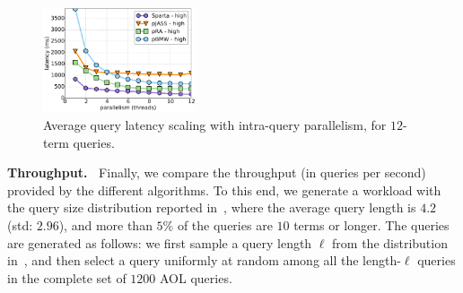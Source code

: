 {{\begin{figure}[tbh]
\centering
{}
         \includegraphics[width=0.4\textwidth]{figures/latency_12terms_clueweb.pdf}
\caption{Average query latency scaling with intra-query parallelism, for $12$-term queries.}
\label{fig:threads-scaling}
\end{figure}

{\bf Throughput.\ } Finally, we compare the throughput (in queries per second) provided by the different
algorithms. To this end, we generate a workload with the query size distribution reported in~\cite{sigir/Guy16},
where the average query length is $4.2$ (std: $2.96$), and more than $5\%$ of the queries are $10$ terms or longer.
The queries are generated as follows: we first sample a query length $\ell$ from the distribution in~\cite{sigir/Guy16}, and then 
select a query uniformly at random among all the length-$\ell$ queries in the complete set of  $1200$ AOL queries. 

}}
